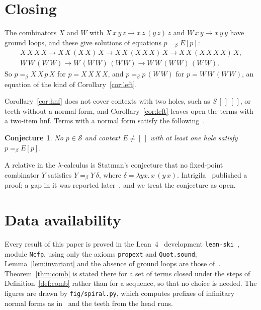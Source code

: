 \documentclass[11pt]{amsart}
\newtheorem{conjecture}[theorem]{Conjecture}
\theoremstyle{definition}
\newcommand{\Ter}{\mathcal S}
\newcommand{\conv}{=_\beta}
\begin{document}
\section{Closing}\label{sec:close}

The combinators $X$ and $W$ with $X\,x\,y\,z\to x\,z\,(y\,z)\,z$ and $W\,x\,y\to x\,y\,y$ have
ground loops, and these give solutions of equations $p\conv E[p]$:
\begin{gather*}
X\,X\,X\,X\to X\,X\,(X\,X)\,X\to X\,X\,(X\,X\,X)\,X\to X\,X\,(X\,X\,X\,X)\,X,\\
W\,W\,(W\,W)\to W\,(W\,W)\,(W\,W)\to W\,W\,(W\,W)\,(W\,W).
\end{gather*}
So $p\conv X\,X\,p\,X$ for $p=X\,X\,X\,X$, and $p\conv p\,(W\,W)$ for $p=W\,W\,(W\,W)$, an equation of the kind of Corollary~\ref{cor:left}.

Corollary~\ref{cor:hnf} does not cover contexts with two holes, such as $S\,[\,]\,[\,]$, or teeth
without a normal form, and Corollary~\ref{cor:left} leaves open the terms with a two-item hnf.
Terms with a normal form satisfy the following~\citep{s7}.

\begin{conjecture}\label{conj:ncfp}
No $p\in\Ter$ and context $E\ne[\,]$ with at least one hole satisfy $p\conv E[p]$.
\end{conjecture}

\noindent A relative in the $\lambda$-calculus is Statman's conjecture that no fixed-point
combinator $Y$ satisfies $Y\conv Y\,\delta$, where $\delta=\lambda yx.\,x\,(y\,x)$.
Intrigila~\citep{intrigila} published a proof; a gap in it was reported later~\citep{polonsky}, and
we treat the conjecture as open.

\section*{Data availability}
\sloppy
Every result of this paper is proved in the Lean~4~\citep{lean4} development
\texttt{lean-ski}~\citep{leanski}, module \texttt{Ncfp}, using only the axioms \texttt{propext} and
\texttt{Quot.sound}; Lemma~\ref{lem:invariant} and the absence of ground loops are those
of~\citep{s6,s7}. Theorem~\ref{thm:comb} is stated there for a set of terms closed under the steps of
Definition~\ref{def:comb} rather than for a sequence, so that no choice is needed. The figures are
drawn by \texttt{fig/spiral.py}, which computes prefixes of infinitary normal forms as
in~\citep{s3} and the teeth from the head runs.



\end{document}
